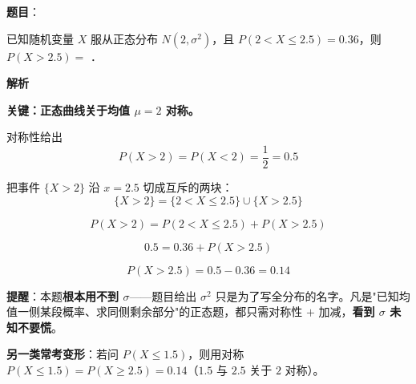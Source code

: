 \begin{answer}

\textbf{题目}：

已知随机变量 $X$ 服从正态分布 $N\left(2,\sigma^{2}\right)$，且 $P(2<X\le2.5)=0.36$，则 $P(X>2.5)=$ \gkblank{}．

\textbf{解析}

\textbf{关键：正态曲线关于均值 $\mu=2$ 对称。}

对称性给出
\nopagebreak[4]
\[P(X>2)=P(X<2)=\frac12=0.5\]

把事件 $\{X>2\}$ 沿 $x=2.5$ 切成互斥的两块：
\nopagebreak[4]
\[\{X>2\}=\{2<X\le2.5\}\cup\{X>2.5\}\]

\nopagebreak[4]
\[P(X>2)=P(2<X\le2.5)+P(X>2.5)\]

\nopagebreak[4]
\[0.5=0.36+P(X>2.5)\]

\nopagebreak[4]
\[P(X>2.5)=0.5-0.36=0.14\]

\begin{gktip}
\textbf{提醒}：本题\textbf{根本用不到 $\sigma$}——题目给出 $\sigma^{2}$ 只是为了写全分布的名字。凡是"已知均值一侧某段概率、求同侧剩余部分"的正态题，都只需对称性 $+$ 加减，\textbf{看到 $\sigma$ 未知不要慌}。

\textbf{另一类常考变形}：若问 $P(X\le1.5)$，则用对称 $P(X\le1.5)=P(X\ge2.5)=0.14$（$1.5$ 与 $2.5$ 关于 $2$ 对称）。
\end{gktip}


\par\medskip

\end{answer}
